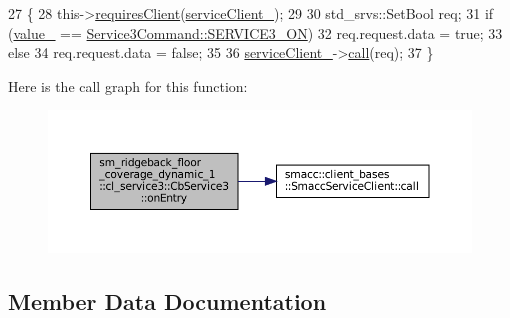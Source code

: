\begin{DoxyCode}
27   \{
28     this->\hyperlink{classsmacc_1_1ISmaccClientBehavior_a32b16e99e3b4cb289414203dc861a440}{requiresClient}(\hyperlink{classsm__ridgeback__floor__coverage__dynamic__1_1_1cl__service3_1_1CbService3_a8a2cee6224cca7b09ac79499062ef782}{serviceClient\_});
29 
30     std\_srvs::SetBool req;
31     \textcolor{keywordflow}{if} (\hyperlink{classsm__ridgeback__floor__coverage__dynamic__1_1_1cl__service3_1_1CbService3_a2ef778d30aaafb2171697f39a1d42402}{value\_} == \hyperlink{namespacesm__ridgeback__floor__coverage__dynamic__1_1_1cl__service3_a44063f74ff3bc29b2e2e09b19416e604a13cdca48a01bbb44fa8fb35567fbc58e}{Service3Command::SERVICE3\_ON})
32       req.request.data = \textcolor{keyword}{true};
33     \textcolor{keywordflow}{else}
34       req.request.data = \textcolor{keyword}{false};
35 
36     \hyperlink{classsm__ridgeback__floor__coverage__dynamic__1_1_1cl__service3_1_1CbService3_a8a2cee6224cca7b09ac79499062ef782}{serviceClient\_}->\hyperlink{classsmacc_1_1client__bases_1_1SmaccServiceClient_a0e9914f45f1091c38bb9ad6187d07977}{call}(req);
37   \}
\end{DoxyCode}
Here is the call graph for this function\+:
\nopagebreak
\begin{figure}[H]
\begin{center}
\leavevmode
\includegraphics[width=350pt]{classsm__ridgeback__floor__coverage__dynamic__1_1_1cl__service3_1_1CbService3_a2bea1cd5cff40e33307b0858ea9baf0b_cgraph}
\end{center}
\end{figure}


\subsection{Member Data Documentation}
\mbox{\label{classsm__ridgeback__floor__coverage__dynamic__1_1_1cl__service3_1_1CbService3_a8a2cee6224cca7b09ac79499062ef782}} 
